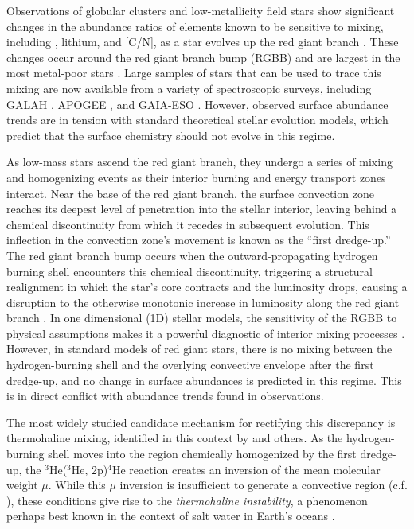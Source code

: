 %
%
%
Observations of globular clusters and low-metallicity field stars show significant changes in the abundance ratios of elements known to be sensitive to mixing, including \ctwelvecthirteen, lithium, and [C/N], as a star evolves up the red giant branch \citep{Carbon1982, Pilachowski1986, Kraft1994, Shetrone2019}. These changes occur around the red giant branch bump (RGBB) and are largest in the most metal-poor stars \citep[e.g.][]{Gratton2000}. Large samples of stars that can be used to trace this mixing are now available from a variety of spectroscopic surveys, including GALAH \citep{buder2019}, APOGEE \citep{DR17}, and GAIA-ESO \citep{Magrini2021b}. However, observed surface abundance trends are in tension with standard theoretical stellar evolution models, which predict that the surface chemistry should not evolve in this regime.

As low-mass stars ascend the red giant branch, they undergo a series of mixing and homogenizing events as their interior burning and energy transport zones interact. Near the base of the red giant branch, the surface convection zone reaches its deepest level of penetration into the stellar interior, leaving behind a chemical discontinuity from which it recedes in subsequent evolution. This inflection in the convection zone's movement is known as the ``first dredge-up.'' The red giant branch bump occurs when the outward-propagating hydrogen burning shell encounters this chemical discontinuity, triggering a structural realignment in which the star's core contracts and the luminosity drops, causing a disruption to the otherwise monotonic increase in luminosity along the red giant branch \citep{Christensen-Dalsgaard:2015}. In one dimensional (1D) stellar models, the sensitivity of the RGBB to physical assumptions makes it a powerful diagnostic of interior mixing processes \citep[e.g.][]{Joyce2015, Khan2018}. 
%
However, in standard models of red giant stars, there is no mixing between the hydrogen-burning shell and the overlying convective envelope after the first dredge-up, and no change in surface abundances is predicted in this regime. This is in direct conflict with abundance trends found in observations.

The most widely studied candidate mechanism for rectifying this discrepancy is thermohaline mixing, identified in this context by \citet{charbonnel_thermohaline_2007} and others. As the hydrogen-burning shell moves into the region chemically homogenized by the  first dredge-up, the $^3$He($^3$He, 2p)$^4$He reaction creates an inversion of the mean molecular weight $\mu$. While this $\mu$ inversion is insufficient to generate a convective region (c.f. \citealt{CantielloLanger2010}), these conditions give rise to the 
\textit{thermohaline instability}, a phenomenon perhaps best known in the context of salt water in Earth's oceans \citep{Stern1960,baines_gill_1969}. 

